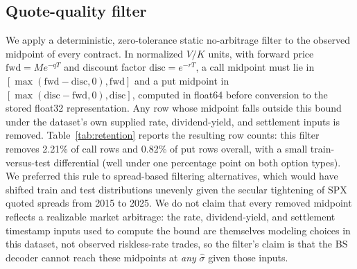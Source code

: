 \documentclass[11pt]{article}
\begin{document}
\subsection{Quote-quality filter}
\label{sec:data-filter}
We apply a deterministic, zero-tolerance static no-arbitrage filter to the observed midpoint of every
contract. In normalized $V/K$ units, with forward price $\mathrm{fwd} = M e^{-qT}$ and discount factor
$\mathrm{disc} = e^{-rT}$, a call midpoint must lie in $[\max(\mathrm{fwd}-\mathrm{disc}, 0),
\mathrm{fwd}]$ and a put midpoint in $[\max(\mathrm{disc}-\mathrm{fwd}, 0), \mathrm{disc}]$, computed in
float64 before conversion to the stored float32 representation. Any row whose midpoint falls outside
this bound under the dataset's own supplied rate, dividend-yield, and settlement inputs is removed.
Table~\ref{tab:retention} reports the resulting row counts: this filter removes 2.21\% of call rows and
0.82\% of put rows overall, with a small train-versus-test differential (well under one percentage
point on both option types). We preferred this rule to spread-based filtering alternatives, which would
have shifted train and test distributions unevenly given the secular tightening of SPX quoted spreads
from 2015 to 2025. We do not claim that every removed midpoint reflects a realizable market arbitrage:
the rate, dividend-yield, and settlement timestamp inputs used to compute the bound are themselves
modeling choices in this dataset, not observed riskless-rate trades, so the filter's claim is that the
BS decoder cannot reach these midpoints at \emph{any} $\hat\sigma$ given those inputs.
\end{document}
